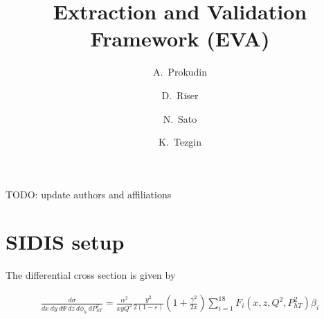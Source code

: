 \documentclass[floatfix,aps,prd,nofootinbib,superscriptaddress,preprint]{revtex4}
\newcommand\3[1]{\boldsymbol{#1}}
\newcommand{\Phperp}{P_{hT}}
\newcommand{\la}{\langle}
\newcommand{\ra}{\rangle}
\begin{document}
\title{Extraction and Validation Framework (EVA)}
{\color{red} TODO: update authors and affiliations}
\author{A.~Prokudin}
\author{D.~Riser}
\author{N.~Sato}
\author{K.~Tezgin}

\maketitle

\newpage

\newcommand{\avp}{\ensuremath{\la P_{\perp}^2\ra_q}}
\newcommand{\avk}{\ensuremath{\la k_{\perp}^2\ra_q}}

\newcommand{\pdf}{{\color{blue} \ensuremath{f_1^q}}}
\newcommand{\ff}{{\color{red} \ensuremath{D_1^{q}}}}
\newcommand{\ppdf}{{\color{Emerald} \ensuremath{g_1^q}}}
\newcommand{\transversity}{{\color{gray} \ensuremath{h_1^q}}}
\newcommand{\sivers}{{\color{brown} \ensuremath{f^{\perp(1)q}_{1T}}}}
\newcommand{\boermulders}{{\color{purple} \ensuremath{h^{\perp(1)q}_1 }}}
\newcommand{\pretzelosity}{{\color{violet} \ensuremath{h^{\perp(1)q}_{1T} }}}
\newcommand{\collins}{{\color{orange} \ensuremath{H^{\perp(1)q}_{1} }}}
\newcommand{\gww}{{\color{magenta} \ensuremath{g^{\perp q}_{1T}}}}
\newcommand{\hww}{{\color{cyan}\ensuremath{h^{\perp q}_{1L}}}}

\newcommand{\wpdf}{0.57}
\newcommand{\wff}{0.12}
\newcommand{\wppdf}{0.19}
\newcommand{\wtransversity}{0.25}
\newcommand{\wsivers}{0.143}
\newcommand{\wboermulders}{0.085}
\newcommand{\wpretzelosity}{0.137}
\newcommand{\wcollins}{0.11}
\newcommand{\wgww}{0.19}
\newcommand{\whww}{0.25}


\section{SIDIS setup}

The differential cross section is given by 

\begin{align}
\frac{d\sigma}{dx ~ dy ~ d\Psi ~ dz ~ d\phi_h ~ d\Phperp^2} = 
\frac{\alpha^2}{xyQ^2}\frac{y^2}{2(1-\varepsilon)}\left(1+\frac{\gamma^2}{2x} \right) 
\sum_{i=1}^{18} F_i(x,z,Q^2,\Phperp^2) \beta_i 
\end{align}
\end{document}
